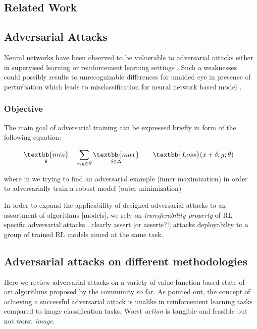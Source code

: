\documentclass[a4paper,12pt]{article}
\begin{document}
\subsection{Related Work}

\subsection{Adversarial Attacks}
Neural networks have been observed to be vulnerable to adversarial attacks either in supervised learning or reinforcement learning settings \cite{Huang2017}. Such a weaknesses could possibly results to unrecognizable differences for unaided eye in presence of perturbation which leads to misclassification for neural network based model \cite{Szegedy2014, Goodfellow2014}.

\subsubsection{Objective}
The main goal of adversarial training can be expressed briefly in form of the following equation:

\begin{equation*}
\begin{aligned}
& \underset{\theta}{\textbb{min}}
& & \sum_{x,y \in S} \underset{\delta \in \Delta}{\textbb{max}}
& & & \textbb{Loss}(x + \delta, y; \theta)
\end{aligned}
\end{equation*}

where in we trying to find an adversarial example (inner maximization) in order to adversarially train a robust model (outer minimization)

In order to expand the applicability of designed adversarial attacks to an assortment of algorithms [models], we rely on \textit{transferability property} of RL-specific adversarial attacks \cite{Szegedy2014, Papernot2016, Goodfellow2014a}. \citet{Huang2017} clearly assert [or asserts?!] attacks deployabilty to a group of trained RL models aimed at the same task.  

\subsection{Adversarial attacks on different methodologies}
Here we review adversarial attacks on a variety of value function based state-of-art algorithms proposed by the community so far. As \citet{Pattanaik2018} pointed out, the concept of achieving a successful adversarial attack is unalike in reinforcement learning tasks compared to image classification tasks. Worst \textit{action} is tangible and feasible but not worst \textit{image}.
\end{document}
